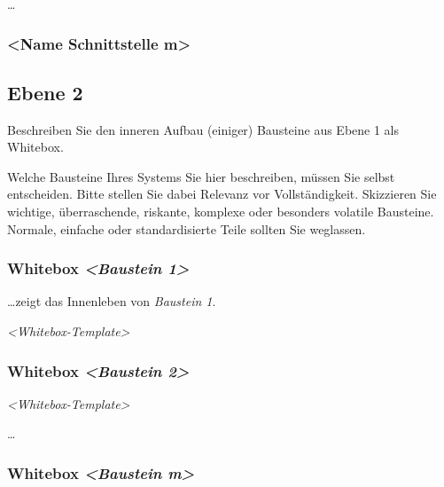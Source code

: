 \documentclass[]{article}
\begin{document}
\ldots{}

\hypertarget{__name_schnittstelle_m}{%
\subsubsection{\textless{}Name Schnittstelle
m\textgreater{}}\label{__name_schnittstelle_m}}

\hypertarget{_ebene_2}{%
\subsection{Ebene 2}\label{_ebene_2}}

Beschreiben Sie den inneren Aufbau (einiger) Bausteine aus Ebene 1 als
Whitebox.

Welche Bausteine Ihres Systems Sie hier beschreiben, müssen Sie selbst
entscheiden. Bitte stellen Sie dabei Relevanz vor Vollständigkeit.
Skizzieren Sie wichtige, überraschende, riskante, komplexe oder
besonders volatile Bausteine. Normale, einfache oder standardisierte
Teile sollten Sie weglassen.

\hypertarget{_whitebox_emphasis_baustein_1_emphasis}{%
\subsubsection{\texorpdfstring{Whitebox \emph{\textless{}Baustein
1\textgreater{}}}{Whitebox \textless{}Baustein 1\textgreater{}}}\label{_whitebox_emphasis_baustein_1_emphasis}}

\ldots{}zeigt das Innenleben von \emph{Baustein 1}.

\emph{\textless{}Whitebox-Template\textgreater{}}

\hypertarget{_whitebox_emphasis_baustein_2_emphasis}{%
\subsubsection{\texorpdfstring{Whitebox \emph{\textless{}Baustein
2\textgreater{}}}{Whitebox \textless{}Baustein 2\textgreater{}}}\label{_whitebox_emphasis_baustein_2_emphasis}}

\emph{\textless{}Whitebox-Template\textgreater{}}

\ldots{}

\hypertarget{_whitebox_emphasis_baustein_m_emphasis}{%
\subsubsection{\texorpdfstring{Whitebox \emph{\textless{}Baustein
m\textgreater{}}}{Whitebox \textless{}Baustein m\textgreater{}}}\label{_whitebox_emphasis_baustein_m_emphasis}}
\end{document}
